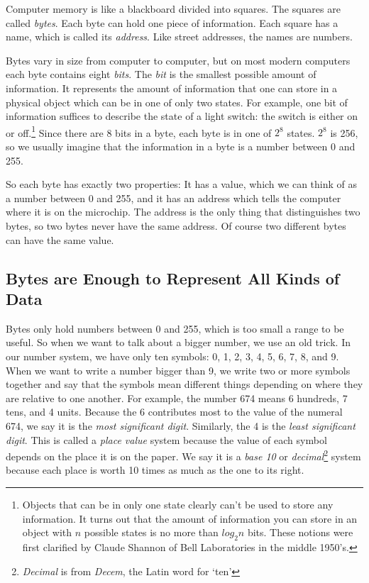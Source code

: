     Computer memory is like a blackboard divided into squares.  The
squares are called {\em bytes}\/. Each byte can hold one piece of
information.  Each square has a name, which is called its {\em
address}\/.  Like street addresses, the names are numbers.

    Bytes vary in size from computer to computer, but on most modern
computers each byte contains eight {\em bits}.  The {\em bit}\/ is the
smallest possible amount of information.  It represents the amount of
information that one can store in a physical object which can be in one
of only two states.  For example, one bit of information suffices to
describe the state of a light switch: the switch is either on or
off.\footnote{Objects that can be in only one state clearly can't be
used to store any information.  It turns out that the amount of
information you can store in an object with $n$ possible states is no
more than $log_2 n$ bits.  These notions were first clarified by Claude
Shannon of Bell Laboratories in the middle 1950's.} Since there are 8
bits in a byte, each byte is in one of $2^8$ states.  $2^8$ is 256, so
we usually imagine that the information in a byte is a number between 0
and 255.

    So each byte has exactly two properties: It has a value, which we
can think of as a number between 0 and 255, and it has an address which
tells the computer where it is on the microchip.  The address is the
only thing that distinguishes two bytes, so two bytes never have the
same address.  Of course two different bytes can have the same value.


\subsection{Bytes are Enough to Represent All Kinds of Data}

    Bytes only hold numbers between 0 and 255, which is too small a
range to be useful.  So when we want to talk about a bigger number, we
use an old trick.  In our number system, we have only ten symbols: 0, 1,
2, 3, 4, 5, 6, 7, 8, and 9.  When we want to write a number bigger than
9, we write two or more symbols together and say that the symbols mean
different things depending on where they are relative to one another.
For example, the number 674 means 6 hundreds, 7 tens, and 4 units.
Because the 6 contributes most to the value of the numeral 674, we say
it is the {\em most significant digit}\/.  Similarly, the 4 is the {\em
least significant digit}\/.  This is called a {\em place value} system
because the value of each symbol depends on the place it is on the
paper.  We say it is a {\em base 10} or {\em decimal}\footnote{{\em
Decimal}\/ is from {\em Decem}\/, the Latin word for `ten'} system
because each place is worth 10 times as much as the one to its right.

